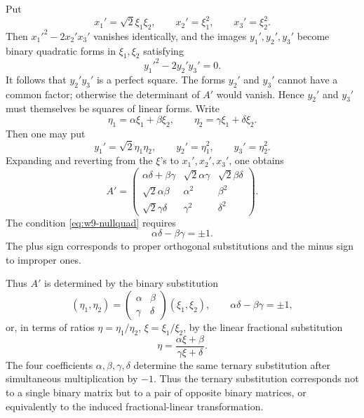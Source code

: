 \documentclass[11pt,a4paper]{book}
\begin{document}
Put
\begin{equation}\label{eq:w9-xi}
 x_1'=\sqrt2\xi_1\xi_2,
 \qquad x_2'=\xi_1^2,
 \qquad x_3'=\xi_2^2.
\end{equation}
Then $x_1'^2-2x_2'x_3'$ vanishes identically, and the images $y_1',y_2',y_3'$ become binary quadratic forms in $\xi_1,\xi_2$ satisfying
\begin{equation}\label{eq:w9-y-null}
 y_1'^2-2y_2'y_3'=0.
\end{equation}
It follows that $y_2'y_3'$ is a perfect square.  The forms $y_2'$ and $y_3'$ cannot have a common factor; otherwise the determinant of $A'$ would vanish.  Hence $y_2'$ and $y_3'$ must themselves be squares of linear forms.  Write
\begin{equation}\label{eq:w9-eta}
 \eta_1=\alpha\xi_1+\beta\xi_2,
 \qquad
 \eta_2=\gamma\xi_1+\delta\xi_2.
\end{equation}
Then one may put
\begin{equation}\label{eq:w9-yeta}
 y_1'=\sqrt2\eta_1\eta_2,
 \qquad y_2'=\eta_1^2,
 \qquad y_3'=\eta_2^2.
\end{equation}
Expanding and reverting from the $\xi$'s to $x_1',x_2',x_3'$, one obtains
\begin{equation}\label{eq:w9-Apmat}
 A'=\begin{pmatrix}
 \alpha\delta+\beta\gamma&\sqrt2\alpha\gamma&\sqrt2\beta\delta\\
 \sqrt2\alpha\beta&\alpha^2&\beta^2\\
 \sqrt2\gamma\delta&\gamma^2&\delta^2
 \end{pmatrix}.
\end{equation}
The condition \eqref{eq:w9-nullquad} requires
\begin{equation}\label{eq:w9-detpm}
 \alpha\delta-\beta\gamma=\pm1.
\end{equation}
The plus sign corresponds to proper orthogonal substitutions and the minus sign to improper ones.

Thus $A'$ is determined by the binary substitution
\begin{equation}\label{eq:w9-bin}
 (\eta_1,\eta_2)=
 \begin{pmatrix}\alpha&\beta\\ \gamma&\delta\end{pmatrix}
 (\xi_1,\xi_2),
\qquad \alpha\delta-\beta\gamma=\pm1,
\end{equation}
or, in terms of ratios $\eta=\eta_1/\eta_2$, $\xi=\xi_1/\xi_2$, by the linear fractional substitution
\begin{equation}\label{eq:w9-frac}
 \eta=\frac{\alpha\xi+\beta}{\gamma\xi+\delta}.
\end{equation}
The four coefficients $\alpha,\beta,\gamma,\delta$ determine the same ternary substitution after simultaneous multiplication by $-1$.  Thus the ternary substitution corresponds not to a single binary matrix but to a pair of opposite binary matrices, or equivalently to the induced fractional-linear transformation.
\end{document}
